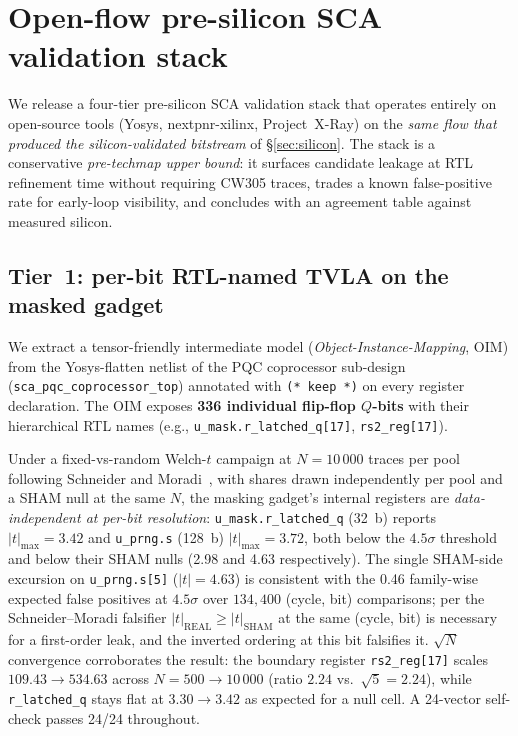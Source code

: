 
\section{Open-flow pre-silicon SCA validation stack}
\label{sec:openflow-stack}

We release a four-tier pre-silicon SCA validation stack that operates entirely
on open-source tools (Yosys, nextpnr-xilinx, Project~X-Ray) on the \emph{same
flow that produced the silicon-validated bitstream} of \S\ref{sec:silicon}.
The stack is a conservative \emph{pre-techmap upper bound}: it surfaces
candidate leakage at RTL refinement time without requiring CW305 traces,
trades a known false-positive rate for early-loop visibility, and concludes
with an agreement table against measured silicon.

\subsection{Tier~1: per-bit RTL-named TVLA on the masked gadget}
\label{sec:tier1}

We extract a tensor-friendly intermediate model
(\textit{Object-Instance-Mapping}, OIM) from the Yosys-flatten netlist of the
PQC coprocessor sub-design (\texttt{sca\_pqc\_coprocessor\_top}) annotated
with \texttt{(* keep *)} on every register declaration.  The OIM exposes
\textbf{336 individual flip-flop $Q$-bits} with their hierarchical RTL
names (e.g., \texttt{u\_mask.r\_latched\_q[17]}, \texttt{rs2\_reg[17]}).

Under a fixed-vs-random Welch-$t$ campaign at $N{=}10\,000$ traces per pool
following Schneider and Moradi~\cite{schneider2015leakage}, with shares drawn
independently per pool and a SHAM null at the same $N$, the masking gadget's
internal registers are \emph{data-independent at per-bit resolution}:
\texttt{u\_mask.r\_latched\_q} (32~b) reports
$|t|_\mathrm{max} = 3.42$ and \texttt{u\_prng.s} (128~b)
$|t|_\mathrm{max} = 3.72$, both below the $4.5\sigma$ threshold and below
their SHAM nulls (2.98 and 4.63 respectively).  The single SHAM-side excursion
on \texttt{u\_prng.s[5]} ($|t|=4.63$) is consistent with the 0.46 family-wise
expected false positives at $4.5\sigma$ over $134{,}400$ (cycle, bit)
comparisons; per the Schneider--Moradi falsifier
$|t|_\mathrm{REAL} \geq |t|_\mathrm{SHAM}$ at the same (cycle, bit) is
necessary for a first-order leak, and the inverted ordering at this bit
falsifies it.  $\sqrt{N}$ convergence corroborates the result: the boundary
register \texttt{rs2\_reg[17]} scales $109.43 \to 534.63$ across $N{=}500
\to 10\,000$ (ratio $2.24$ vs.\ $\sqrt{5}=2.24$), while \texttt{r\_latched\_q}
stays flat at $3.30 \to 3.42$ as expected for a null cell.  A 24-vector
self-check passes 24/24 throughout.

